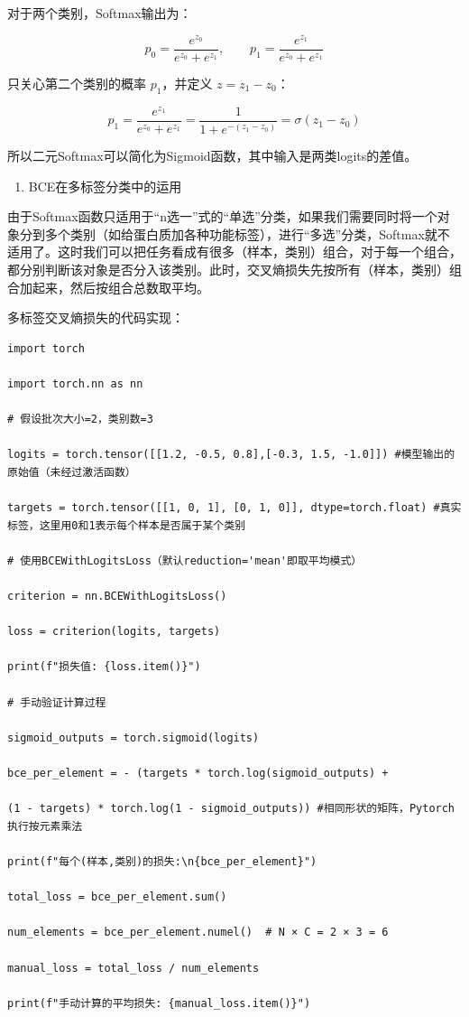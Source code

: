 对于两个类别，Softmax输出为：

\[
p_0=\frac{e^{z_0}}{e^{z_0}+e^{z_1}},\qquad
p_1=\frac{e^{z_1}}{e^{z_0}+e^{z_1}}
\]

只关心第二个类别的概率 \(p_1\)，并定义 \(z=z_1-z_0\)：

\[
p_1=\frac{e^{z_1}}{e^{z_0}+e^{z_1}}
=\frac{1}{1+e^{-(z_1-z_0)}}
=\sigma(z_1-z_0)
\]

所以二元Softmax可以简化为Sigmoid函数，其中输入是两类logits的差值。

\begin{enumerate}
\def\labelenumi{\arabic{enumi}.}
\setcounter{enumi}{2}
\tightlist
\item
  BCE在多标签分类中的运用
\end{enumerate}

由于Softmax函数只适用于``n选一''式的``单选''分类，如果我们需要同时将一个对象分到多个类别（如给蛋白质加各种功能标签），进行``多选''分类，Softmax就不适用了。这时我们可以把任务看成有很多（样本，类别）组合，对于每一个组合，都分别判断该对象是否分入该类别。此时，交叉熵损失先按所有（样本，类别）组合加起来，然后按组合总数取平均。

多标签交叉熵损失的代码实现：

\begin{verbatim}
import torch

import torch.nn as nn

# 假设批次大小=2，类别数=3

logits = torch.tensor([[1.2, -0.5, 0.8],[-0.3, 1.5, -1.0]]) #模型输出的原始值（未经过激活函数）

targets = torch.tensor([[1, 0, 1], [0, 1, 0]], dtype=torch.float) #真实标签，这里用0和1表示每个样本是否属于某个类别

# 使用BCEWithLogitsLoss（默认reduction='mean'即取平均模式）

criterion = nn.BCEWithLogitsLoss()

loss = criterion(logits, targets)

print(f"损失值: {loss.item()}")

# 手动验证计算过程

sigmoid_outputs = torch.sigmoid(logits)

bce_per_element = - (targets * torch.log(sigmoid_outputs) +

(1 - targets) * torch.log(1 - sigmoid_outputs)) #相同形状的矩阵，Pytorch执行按元素乘法

print(f"每个(样本,类别)的损失:\n{bce_per_element}")

total_loss = bce_per_element.sum()

num_elements = bce_per_element.numel()  # N × C = 2 × 3 = 6

manual_loss = total_loss / num_elements

print(f"手动计算的平均损失: {manual_loss.item()}")
\end{verbatim}

